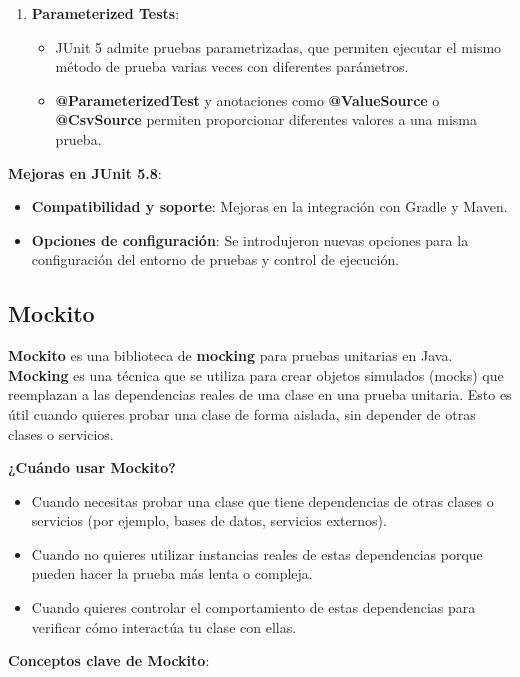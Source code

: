 \documentclass[11pt]{article}
\begin{document}
\begin{enumerate}
\item \textbf{\textbf{Parameterized Tests}}:
\begin{itemize}
\item JUnit 5 admite pruebas parametrizadas, que permiten ejecutar el mismo método de prueba varias veces con diferentes parámetros.
\item \textbf{\textbf{@ParameterizedTest}} y anotaciones como \textbf{\textbf{@ValueSource}} o \textbf{\textbf{@CsvSource}} permiten proporcionar diferentes valores a una misma prueba.
\end{itemize}
\end{enumerate}

\textbf{\textbf{Mejoras en JUnit 5.8}}:
\begin{itemize}
\item \textbf{\textbf{Compatibilidad y soporte}}: Mejoras en la integración con Gradle y Maven.
\item \textbf{\textbf{Opciones de configuración}}: Se introdujeron nuevas opciones para la configuración del entorno de pruebas y control de ejecución.
\end{itemize}

\subsection{Mockito}
\label{sec:org2ab9b14}

\textbf{\textbf{Mockito}} es una biblioteca de \textbf{\textbf{mocking}} para pruebas unitarias en Java. \textbf{\textbf{Mocking}} es una técnica que se utiliza para crear objetos simulados (mocks) que reemplazan a las dependencias reales de una clase en una prueba unitaria. Esto es útil cuando quieres probar una clase de forma aislada, sin depender de otras clases o servicios.

\textbf{\textbf{¿Cuándo usar Mockito?}}
\begin{itemize}
\item Cuando necesitas probar una clase que tiene dependencias de otras clases o servicios (por ejemplo, bases de datos, servicios externos).
\item Cuando no quieres utilizar instancias reales de estas dependencias porque pueden hacer la prueba más lenta o compleja.
\item Cuando quieres controlar el comportamiento de estas dependencias para verificar cómo interactúa tu clase con ellas.
\end{itemize}

\textbf{\textbf{Conceptos clave de Mockito}}:
\end{document}

